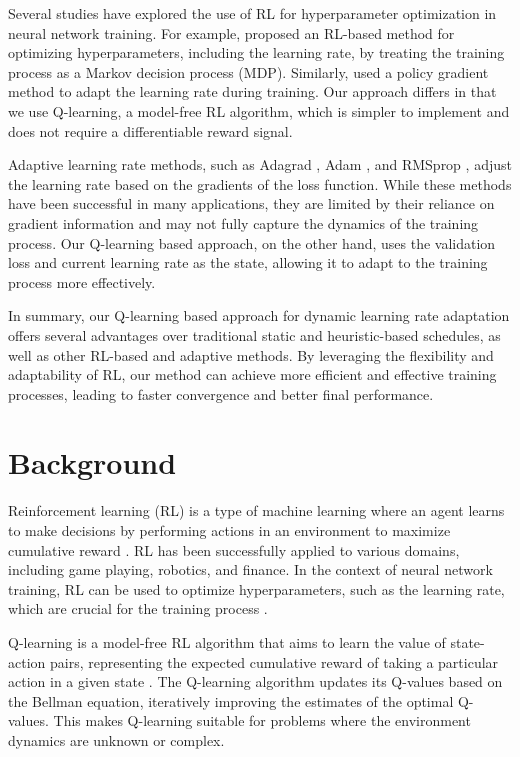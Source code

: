 \documentclass{article} %
\begin{document}
Several studies have explored the use of RL for hyperparameter optimization in neural network training. For example, \citet{goodfellow2016deep} proposed an RL-based method for optimizing hyperparameters, including the learning rate, by treating the training process as a Markov decision process (MDP). Similarly, \citet{kingma2014adam} used a policy gradient method to adapt the learning rate during training. Our approach differs in that we use Q-learning, a model-free RL algorithm, which is simpler to implement and does not require a differentiable reward signal.

Adaptive learning rate methods, such as Adagrad \citep{Traor'e2020SequentialCO}, Adam \citep{kingma2014adam}, and RMSprop \citep{Xu2021ConvergenceOT}, adjust the learning rate based on the gradients of the loss function. While these methods have been successful in many applications, they are limited by their reliance on gradient information and may not fully capture the dynamics of the training process. Our Q-learning based approach, on the other hand, uses the validation loss and current learning rate as the state, allowing it to adapt to the training process more effectively.

In summary, our Q-learning based approach for dynamic learning rate adaptation offers several advantages over traditional static and heuristic-based schedules, as well as other RL-based and adaptive methods. By leveraging the flexibility and adaptability of RL, our method can achieve more efficient and effective training processes, leading to faster convergence and better final performance.

\section{Background}
\label{sec:background}

Reinforcement learning (RL) is a type of machine learning where an agent learns to make decisions by performing actions in an environment to maximize cumulative reward \citep{goodfellow2016deep}. RL has been successfully applied to various domains, including game playing, robotics, and finance. In the context of neural network training, RL can be used to optimize hyperparameters, such as the learning rate, which are crucial for the training process \citep{kingma2014adam}.

Q-learning is a model-free RL algorithm that aims to learn the value of state-action pairs, representing the expected cumulative reward of taking a particular action in a given state \citep{goodfellow2016deep}. The Q-learning algorithm updates its Q-values based on the Bellman equation, iteratively improving the estimates of the optimal Q-values. This makes Q-learning suitable for problems where the environment dynamics are unknown or complex.
\end{document}
